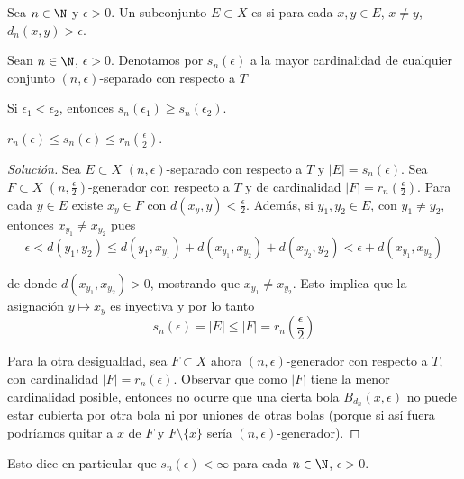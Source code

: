 \documentclass[	docname= Sistemas\ Din\'amicos,
				finished=1,
				semester=1,
				year=2017,
				professor=Godofredo\ Iommi,
				sigla=MAT2565]{apunte}
\begin{document}
\begin{defn} Sea $n \in \N$ y $\epsilon > 0$. Un subconjunto $E \subset X$ es  si para cada $x,y \in E$, $x \neq y$, $d_{n}(x,y) > \epsilon$.  
\end{defn}

\begin{defn} Sean $n \in \N$, $\epsilon > 0$. Denotamos por $s_{n}(\epsilon)$ a la mayor cardinalidad de cualquier conjunto $(n,\epsilon)$-separado con respecto a $T$
\end{defn}

\begin{obsd} Si $\epsilon_{1} < \epsilon_{2}$, entonces $s_{n}(\epsilon_{1}) \geq s_{n}(\epsilon_{2})$.
\end{obsd}

\begin{ej} $r_{n}(\epsilon) \leq s_{n}(\epsilon) \leq r_{n}\left(\frac{\epsilon}{2}\right)$.
\end{ej}

\begin{proof}[Solución] Sea $E \subset X$ $(n,\epsilon)$-separado con respecto a $T$ y $|E| = s_{n}(\epsilon)$. Sea $F \subset X$ $\left(n,\frac{\epsilon}{2}\right)$-generador con respecto a $T$ y de cardinalidad $|F| = r_{n}\left(\frac{\epsilon}{2}\right)$. Para cada $y \in E$ existe $x_{y} \in F$ con $d(x_{y}, y) < \frac{\epsilon}{2}$. Además, si $y_{1}, y_{2} \in E$, con $y_{1} \neq y_{2}$, entonces $x_{y_{1}} \neq x_{y_{2}}$ pues
	$$\epsilon < d(y_{1}, y_{2}) \leq d(y_{1}, x_{y_{1}}) + d(x_{y_{1}}, x_{y_{2}}) + d(x_{y_{2}}, y_{2}) < \epsilon + d(x_{y_{1}}, x_{y_{2}})$$

de donde $d(x_{y_{1}},x_{y_{2}}) > 0$, mostrando que $x_{y_{1}} \neq x_{y_{2}}$. Esto implica que la asignación $y \mapsto x_{y}$ es inyectiva y por lo tanto 
	$$s_{n}(\epsilon) = |E| \leq |F| = r _{n}\left(\frac{\epsilon}{2}\right)$$

Para la otra desigualdad, sea $F \subset X$ ahora $(n,\epsilon)$-generador con respecto a $T$, con cardinalidad $|F| = r_{n}(\epsilon)$. Observar que como $|F|$ tiene la menor cardinalidad posible, entonces no ocurre que una cierta bola $B_{d_{n}}(x,\epsilon)$ no puede estar cubierta por otra bola ni por uniones de otras bolas (porque si así fuera podríamos quitar a $x$ de $F$ y $F\setminus\{x\}$ sería $(n,\epsilon)$-generador). 
\end{proof}


\begin{obsej} Esto dice en particular que $s_{n}(\epsilon) < \infty$ para cada $n \in \N$, $\epsilon > 0$.
\end{obsej}
\end{document}
